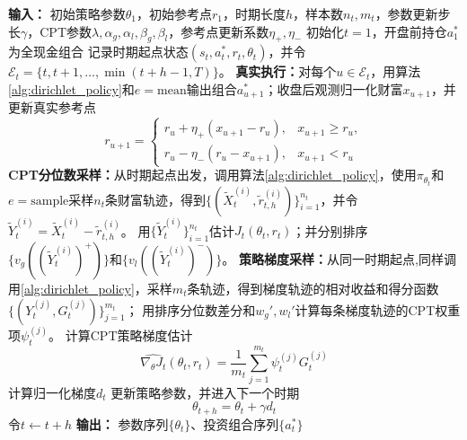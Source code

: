 \documentclass{sufethesismas}
\begin{document}
\begin{algorithm}[H]
\caption{基于动态参考点的CPT-PG在线优化器}
\label{alg:drcpt_pg_ch2}
\begin{algorithmic}[1]
\STATE \textbf{输入：} 初始策略参数$\theta_1$，初始参考点$r_1$，时期长度$h$，样本数$n_t,m_t$，参数更新步长$\gamma$，CPT参数$\lambda,\alpha_g,\alpha_l,\beta_g,\beta_l$，参考点更新系数$\eta_+,\eta_-$
\STATE 初始化$t=1$，开盘前持仓$a_1^*$为全现金组合
    \STATE 记录时期起点状态$(s_t,a_t^*,r_t,\theta_t)$，并令$\mathcal{E}_t=\{t,t+1,\ldots,\min(t+h-1,T)\}$。
    \STATE \textbf{真实执行：}对每个$u\in\mathcal{E}_t$，用算法\ref{alg:dirichlet_policy}和$e=\mathrm{mean}$输出组合$a_{u+1}^*$；收盘后观测归一化财富$x_{u+1}$，并更新真实参考点
    \begin{equation*}
    r_{u+1}
    =
    \begin{cases}
    r_u+\eta_+\left(x_{u+1}-r_u\right), & x_{u+1}\ge r_u,\\[4pt]
    r_u-\eta_-\left(r_u-x_{u+1}\right), & x_{u+1}<r_u
    \end{cases}
    \end{equation*}
    \STATE \textbf{CPT分位数采样：}从时期起点出发，调用算法\ref{alg:dirichlet_policy}，使用$\pi_{\theta_t}$和$e=\mathrm{sample}$采样$n_t$条财富轨迹，得到$\{(\widetilde X_t^{(i)},\widetilde r_{t,h}^{(i)})\}_{i=1}^{n_t}$，并令$\widetilde Y_t^{(i)}=\widetilde X_t^{(i)}-\widetilde r_{t,h}^{(i)}$。
    \STATE 用$\{\widetilde Y_t^{(i)}\}_{i=1}^{n_t}$估计$J_t(\theta_t,r_t)$；并分别排序$\{v_g((\widetilde Y_t^{(i)})^+)\}$和$\{v_l((\widetilde Y_t^{(i)})^-)\}$。
    \STATE \textbf{策略梯度采样：}从同一时期起点,同样调用\ref{alg:dirichlet_policy}，采样$m_t$条轨迹，得到梯度轨迹的相对收益和得分函数$\{(Y_t^{(j)},G_t^{(j)})\}_{j=1}^{m_t}$；
    \STATE 用排序分位数差分和$w_g',w_l'$计算每条梯度轨迹的CPT权重项$\psi_t^{(j)}$。
    \STATE 计算CPT策略梯度估计
    \begin{equation*}
    \widehat{\nabla_\theta J_t}(\theta_{t},r_t)
    =
    \frac{1}{m_t}
    \sum_{j=1}^{m_t}
    \psi_t^{(j)}
    G_t^{(j)}
    \end{equation*}
    \STATE 计算归一化梯度$d_t$
    \STATE 更新策略参数，并进入下一个时期
    \begin{equation*}
    \theta_{t+h}
    =
    \theta_t+\gamma d_t
    \end{equation*}
    \STATE 令$t\leftarrow t+h$
\ENDWHILE
\STATE \textbf{输出：} 参数序列$\{\theta_t\}$、投资组合序列$\{a_t^*\}$
\end{algorithmic}
\end{algorithm}
\end{document}
